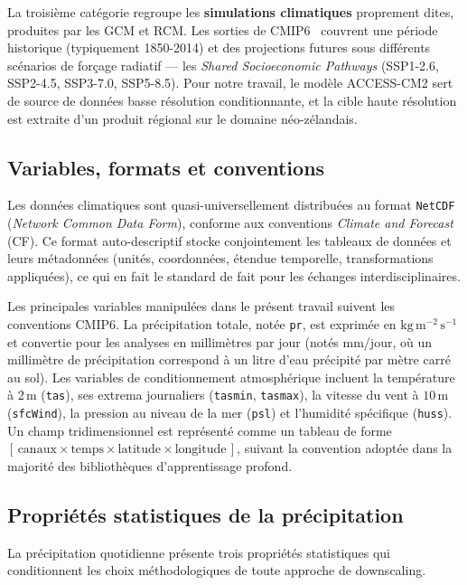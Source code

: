 \documentclass[14pt,a4paper,openany]{extreport}
\theoremstyle{definition}
\begin{document}
La troisième catégorie regroupe les \textbf{simulations climatiques} proprement dites, produites par les GCM et RCM. Les sorties de CMIP6~\cite{eyring_cmip6_2016} couvrent une période historique (typiquement 1850-2014) et des projections futures sous différents scénarios de forçage radiatif --- les \emph{Shared Socioeconomic Pathways} (SSP1-2.6, SSP2-4.5, SSP3-7.0, SSP5-8.5). Pour notre travail, le modèle ACCESS-CM2 sert de source de données basse résolution conditionnante, et la cible haute résolution est extraite d'un produit régional sur le domaine néo-zélandais.

\subsection{Variables, formats et conventions}
\label{ssec:formats}

Les données climatiques sont quasi-universellement distribuées au format \texttt{NetCDF} (\emph{Network Common Data Form}), conforme aux conventions \emph{Climate and Forecast} (CF). Ce format auto-descriptif stocke conjointement les tableaux de données et leurs métadonnées (unités, coordonnées, étendue temporelle, transformations appliquées), ce qui en fait le standard de fait pour les échanges interdisciplinaires.

Les principales variables manipulées dans le présent travail suivent les conventions CMIP6. La précipitation totale, notée \texttt{pr}, est exprimée en $\mathrm{kg}\,\mathrm{m}^{-2}\,\mathrm{s}^{-1}$ et convertie pour les analyses en millimètres par jour (notés mm/jour, où un millimètre de précipitation correspond à un litre d'eau précipité par mètre carré au sol). Les variables de conditionnement atmosphérique incluent la température à $2\,\mathrm{m}$ (\texttt{tas}), ses extrema journaliers (\texttt{tasmin}, \texttt{tasmax}), la vitesse du vent à $10\,\mathrm{m}$ (\texttt{sfcWind}), la pression au niveau de la mer (\texttt{psl}) et l'humidité spécifique (\texttt{huss}). Un champ tridimensionnel est représenté comme un tableau de forme $[\,\text{canaux} \times \text{temps} \times \text{latitude} \times \text{longitude}\,]$, suivant la convention adoptée dans la majorité des bibliothèques d'apprentissage profond.

\subsection{Propriétés statistiques de la précipitation}
\label{ssec:stats-precip}

La précipitation quotidienne présente trois propriétés statistiques qui conditionnent les choix méthodologiques de toute approche de downscaling.
\end{document}
